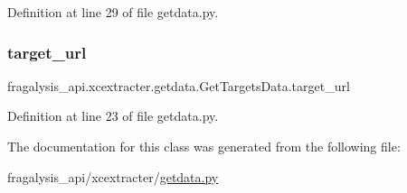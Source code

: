 Definition at line 29 of file getdata.\+py.

\mbox{\label{classfragalysis__api_1_1xcextracter_1_1getdata_1_1_get_targets_data_a7c14c7714ad794c49aa6354d47afdeba}} 
\subsubsection{\texorpdfstring{target\+\_\+url}{target\_url}}
{\footnotesize\ttfamily fragalysis\+\_\+api.\+xcextracter.\+getdata.\+Get\+Targets\+Data.\+target\+\_\+url}



Definition at line 23 of file getdata.\+py.



The documentation for this class was generated from the following file\+:\begin{DoxyCompactItemize}
\item 
fragalysis\+\_\+api/xcextracter/\hyperlink{getdata_8py}{getdata.\+py}\end{DoxyCompactItemize}
